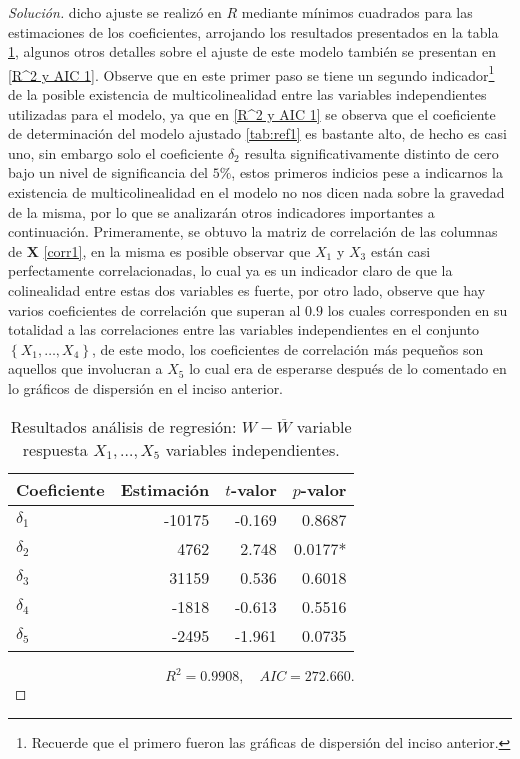 \documentclass[10.5pt,notitlepage]{article}
\newenvironment{solucion}
  {\begin{proof}[Solución]}
  {\end{proof}}
\newcommand{\kis}[1]{\left\{ #1 \right\}}
\theoremstyle{plain}
\begin{document}
\begin{solucion}
dicho ajuste se realizó en \(R\) mediante mínimos cuadrados para las estimaciones de los coeficientes, arrojando los resultados presentados en la tabla \ref{tab:ref1}, algunos otros detalles sobre el ajuste de este modelo también se presentan en \eqref{R^2 y AIC 1}. Observe que en este primer paso se tiene un segundo indicador\footnote{Recuerde que el primero fueron las gráficas de dispersión del inciso anterior.} de la posible existencia de multicolinealidad entre las variables independientes utilizadas para el modelo, ya que en \eqref{R^2 y AIC 1} se observa que el coeficiente de determinación del modelo ajustado \eqref{tab:ref1} es bastante alto, de hecho es casi uno, sin embargo solo el coeficiente \(\delta_2\) resulta significativamente distinto de cero bajo un nivel de significancia del \(5\%\), estos primeros indicios pese a indicarnos la existencia de multicolinealidad en el modelo no nos dicen nada sobre la gravedad de la misma, por lo que se analizarán otros indicadores importantes a continuación. Primeramente, se obtuvo la matriz de correlación de las columnas de \(\mathbf{X}\) \eqref{corr1}, en la misma es posible observar que \(X_1\) y \(X_3\) están casi perfectamente correlacionadas, lo cual ya es un indicador claro de que la colinealidad entre estas dos variables es fuerte, por otro lado, observe que hay varios coeficientes de correlación que superan al \(0.9\) los cuales corresponden en su totalidad a las correlaciones entre las variables independientes en el conjunto \(\kis{X_1,\hdots,X_4}\), de este modo, los coeficientes de correlación más pequeños son aquellos que involucran a \(X_5\) lo cual era de esperarse después de lo comentado en lo gráficos de dispersión en el inciso anterior.
\begin{table}[H]
        \centering
        \begin{tabular}{@{}l@{\hskip 0.3in}r@{\hskip 0.3in}r@{\hskip 0.3in}r@{}}
            \toprule
            Coeficiente& Estimación & \(t\)-valor& \(p\)-valor \\
            \midrule
             \(\delta_1\) &  -10175 & -0.169 &  0.8687\\  
             \(\delta_2\)&    4762 &  2.748 &   0.0177*\\ 
             \(\delta_3\) &   31159 &  0.536 &  0.6018\\  
             \(\delta_4\) &   -1818 & -0.613 &  0.5516\\  
             \(\delta_5\) &   -2495 & -1.961 &  0.0735\\
            \bottomrule
        \end{tabular}
        \caption{Resultados análisis de regresión: \(W - \overline{W}\) variable respuesta \(X_1, \hdots, X_5\) variables independientes.}
        \label{tab:ref1}
\end{table}
\begin{equation}\label{R^2 y AIC 1}
    R^2 = 0.9908, \quad AIC = 272.660. 
\end{equation}


\end{solucion}
\end{document}
